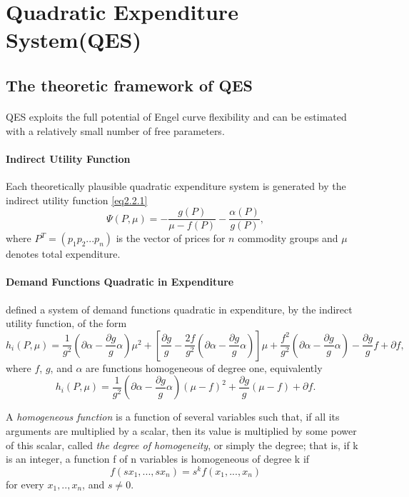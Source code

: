 \section{Quadratic Expenditure System(QES)}
\subsection{The theoretic framework of QES}
\paragraph{}{QES exploits the full potential of Engel curve flexibility and can be estimated with a relatively small number of free parameters. }

\paragraph{Indirect Utility Function}{Each theoretically plausible quadratic expenditure system is generated by the indirect utility function \cref{eq2.2.1}
	\begin{equation}\label{eq2.2.1}
		\Psi(P,\mu) = -\frac{g(P)}{\mu - f(P)} - \frac{\alpha (P)}{g(P)},
	\end{equation}
where $P^T=(p_1 p_2 ... p_n)$ is the vector of prices for $n$ commodity groups and $\mu$ denotes total expenditure. 
}

\paragraph{Demand Functions Quadratic in Expenditure\\}{
\cite{Howe1979} defined a system of demand functions quadratic in expenditure, by the indirect utility function, of the form
	\begin{equation} \label{eq2.2.2}
		h_i(P,\mu) = \frac{1}{g^2}(\partial \alpha - \frac{\partial g}{g} \alpha) \mu^2 + [\frac{\partial g}{g} - \frac{2f}{g^2}(\partial \alpha -\frac{\partial g}{g} \alpha )] \mu + \frac{f^2}{g^2}(\partial \alpha - \frac{\partial g}{g} \alpha) - \frac{\partial g}{g}f + \partial f,
	\end{equation}
where $f$, $g$, and $\alpha$ are functions homogeneous of degree one, equivalently
	\begin{equation} \label{eq2.2.3}
		h_i(P,\mu) = \frac{1}{g^2}(\partial \alpha - \frac{\partial g}{g} \alpha) (\mu - f)^2 + \frac{\partial g}{g} (\mu - f) + \partial f.
	\end{equation}

 \small{A \textit{homogeneous function} is a function of several variables such that, if all its arguments are multiplied by a scalar, then its value is multiplied by some power of this scalar, called \textit{the degree of homogeneity}, or simply the degree; that is, if k is an integer, a function f of n variables is homogeneous of degree k if
	\begin{equation}\label{eq2.3a}
		f(sx_1,...,sx_n)=s^kf(x_1,...,x_n)  
	\end{equation}
for every $x_1,..,x_n$, and $s \neq 0$.
 }
}

